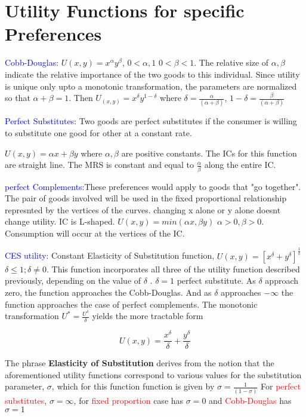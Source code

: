 \documentclass{tufte-handout}
\begin{document}
\section*{Utility Functions for specific Preferences}

\textbullet  \textcolor{blue}{Cobb-Douglas}: $U(x,y) = x^\alpha y^\beta$,  $0 < \alpha ,1$ $0 < \beta < 1$. The relative size of  $\alpha, \beta$ indicate the relative importance of the two goods to this individual.
Since utility is unique only upto a monotonic transformation, the parameters are normalized so that $\alpha + \beta =1 $.
Then  $U_(x,y) = x^\delta y^{1 - \delta}$ where $\delta = \frac{\alpha}{(\alpha + \beta)}$, $1- \delta = \frac{\beta}{(\alpha + \beta)}$

\textbullet   \textcolor{blue}{Perfect Substitutes}: Two goods are perfect substitutes if the consumer is willing to substitute one good for other at a constant rate.

$U(x,y) = \alpha x + \beta y$ where  $\alpha, \beta$ are positive constants. The ICs for this function are straight line. The MRS is constant and equal to  $\frac{\alpha}{\beta}$ along the entire IC. 


\textbullet   \textcolor{blue}{perfect Complements}:These preferences would apply to goods that "go together". The pair of goods involved will be used in the fixed proportional relationship represnted by the vertices of the curves. changing x alone or y alone doesnt change utility. IC is L-shaped. $U(x,y) = min(\alpha x, \beta y)$  $\alpha > 0, \beta > 0$. Consumption will occur at the vertices of the IC.
	
\textbullet  \textcolor{blue}{ CES utility}: Constant Elasticity of Substitution function, $ U(x,y) = [x^\delta + y^\delta]^{\frac{1}{\delta}} $ $\delta \leq 1; \delta \neq 0$.
This function incorporates all three of the utility function described previously, depending on the value of $\delta$ .
$\delta = 1$ perfect substitute. As  $\delta $ approach zero, the function approaches the Cobb-Douglas. And as  $\delta$ approaches  $-\infty$ the function approaches the case of perfect complements. The monotonic transformation  $U^* = \frac{U^\delta}{\delta}$ yields the more tractable form 

$$U(x,y) = \frac{x^\delta}{\delta} + \frac{y^\delta}{\delta}$$

The phrase \textbf{Elasticity of Substitution} derives from the notion that the aforementioned utility functions correspond to various values for the substitution parameter, $\sigma$, which for this function function is given by  $ \sigma = \frac{1}{(1-\sigma)}$
For \textcolor{red}{perfect substitutes}, $\sigma =  \infty$, for \textcolor{red}{fixed proportion} case has $\sigma = 0$ and  \textcolor{red}{Cobb-Douglas} has $\sigma = 1$
\end{document}
